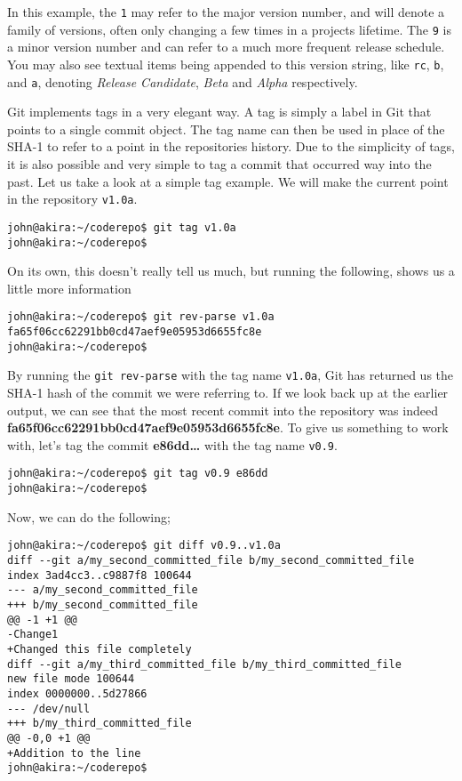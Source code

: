 In this example, the \texttt{1} may refer to the major version number, and will denote a family of versions, often only changing a few times in a projects lifetime.  The \texttt{9} is a minor version number and can refer to a much more frequent release schedule.  You may also see textual items being appended to this version string, like \texttt{rc}, \texttt{b}, and \texttt{a}, denoting \emph{Release Candidate}, \emph{Beta} and \emph{Alpha} respectively.

Git implements tags in a very elegant way.  A tag is simply a label in Git that points to a single commit object.  The tag name can then be used in place of the SHA-1 to refer to a point in the repositories history.  Due to the simplicity of tags, it is also possible and very simple to tag a commit that occurred way into the past.  Let us take a look at a simple tag example.  We will make the current point in the repository \texttt{v1.0a}.

\begin{Verbatim}[frame=leftline,framerule=1mm,fontsize=\relsize{-3}] 
john@akira:~/coderepo$ git tag v1.0a
john@akira:~/coderepo$ 
\end{Verbatim}

On its own, this doesn't really tell us much, but running the following, shows us a little more information

\begin{Verbatim}[frame=leftline,framerule=1mm,fontsize=\relsize{-3}] 
john@akira:~/coderepo$ git rev-parse v1.0a
fa65f06cc62291bb0cd47aef9e05953d6655fc8e
john@akira:~/coderepo$ 
\end{Verbatim}

By running the \texttt{git rev-parse} with the tag name \texttt{v1.0a}, Git has returned us the SHA-1 hash of the commit we were referring to.  If we look back up at the earlier output, we can see that the most recent commit into the repository was indeed \textbf{fa65f06cc62291bb0cd47aef9e05953d6655fc8e}.  To give us something to work with, let's tag the commit \textbf{e86dd\ldots} with the tag name \texttt{v0.9}.

\begin{Verbatim}[frame=leftline,framerule=1mm,fontsize=\relsize{-3}] 
john@akira:~/coderepo$ git tag v0.9 e86dd
john@akira:~/coderepo$ 
\end{Verbatim}

Now, we can do the following;

\begin{Verbatim}[frame=leftline,framerule=1mm,fontsize=\relsize{-3}] 
john@akira:~/coderepo$ git diff v0.9..v1.0a
diff --git a/my_second_committed_file b/my_second_committed_file
index 3ad4cc3..c9887f8 100644
--- a/my_second_committed_file
+++ b/my_second_committed_file
@@ -1 +1 @@
-Change1
+Changed this file completely
diff --git a/my_third_committed_file b/my_third_committed_file
new file mode 100644
index 0000000..5d27866
--- /dev/null
+++ b/my_third_committed_file
@@ -0,0 +1 @@
+Addition to the line
john@akira:~/coderepo$ 
\end{Verbatim}

